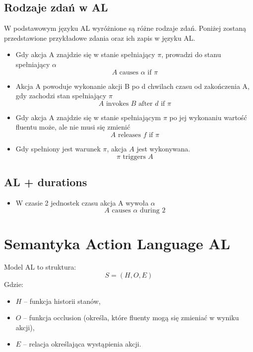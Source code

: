 \documentclass{article}
\begin{document}
\subsection{Rodzaje zdań w AL}

W podstawowym języku AL wyróżnione są różne rodzaje zdań. Poniżej zostaną przedstawione przykładowe zdania oraz ich zapis w języku AL.
\begin{itemize}
    \item Gdy akcja A znajdzie się w stanie spełniający $\pi$, prowadzi do stanu spełniający $\alpha$
    \begin{equation}
     A \text{ causes } \alpha \text{ if } \pi
    \end{equation}

    \item Akcja A powoduje wykonanie akcji B po d chwilach czasu od zakończenia A, gdy zachodzi stan spełniający $\pi$
    \begin{equation}
        A \text{ invokes } B \text{ after } d \text{ if } \pi
    \end{equation}

    \item Gdy akcja A znajdzie się w stanie spełniającym $\pi$ po jej wykonaniu wartość fluentu może, ale nie musi się zmienić
    \begin{equation}
        A \text{ releases } f \text{ if } \pi
    \end{equation}

    \item Gdy spełniony jest warunek $\pi$, akcja $A$ jest wykonywana.
    \begin{equation}
        \pi \text{ triggers } A
    \end{equation}
\end{itemize}

\subsection{AL + durations} 
\begin{itemize}
    \item W czasie 2 jednostek czasu akcja A wywoła $\alpha$
    \begin{equation}
        A \text{ causes } \alpha \text{ during 2} 
    \end{equation}
\end{itemize}

\section{Semantyka Action Language AL}
Model AL to struktura:
\begin{equation}
    S = (H, O, E)
\end{equation}
Gdzie:
\begin{itemize}
    \item $H$ – funkcja historii stanów,
    \item $O$ – funkcja occlusion (określa, które fluenty mogą się zmieniać w wyniku akcji),
    \item $E$ – relacja określająca wystąpienia akcji.
\end{itemize}
\end{document}
